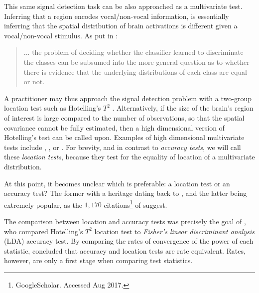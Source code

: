 \documentclass[12pt,a4paper]{article}
\begin{document}
This same signal detection task can be also approached as a multivariate test.
Inferring that a region encodes vocal/non-vocal information, is essentially inferring that the spatial distribution of brain activations is different given a vocal/non-vocal stimulus. 
As put in \cite{pereira_machine_2009}: 
\begin{quote}
... the problem of deciding whether the classifier learned to discriminate the classes can be subsumed into the more general question as to whether there is evidence that the underlying distributions of each class are equal or not.
\end{quote}
A practitioner may thus approach the signal detection problem with a two-group location test such as Hotelling's $T^2$ \citep{anderson_introduction_2003}.
Alternatively, if the size of the brain's region of interest is large compared to the number of observations, so that the spatial covariance cannot be fully estimated, then a high dimensional version of Hotelling's test can be called upon.
Examples of high dimensional multivariate tests include \cite{schafer_shrinkage_2005}, \cite{goeman2006testing}, or \cite{srivastava_multivariate_2007} .
For brevity, and in contrast to \emph{accuracy tests}, we will call these \emph{location tests}, because they test for the equality of location of a multivariate distribution. 


At this point, it becomes unclear which is preferable: a location test or an accuracy test?
The former with a heritage dating back to \cite{hotelling_generalization_1931}, and the latter being extremely popular, as the $1,170$ citations\footnote{GoogleScholar. Accessed Aug 2017.} of \cite{kriegeskorte_information-based_2006} suggest. 

The comparison between location and accuracy tests was precisely the goal of \cite{ramdas_classification_2016}, who compared Hotelling's $T^2$ location test to \emph{Fisher's linear discriminant analysis} (LDA) accuracy test. 
By comparing the rates of convergence of the power of each statistic, \cite{ramdas_classification_2016} concluded that accuracy and location tests are rate equivalent. 
Rates, however, are only a first stage when comparing test statistics. 
\end{document}
